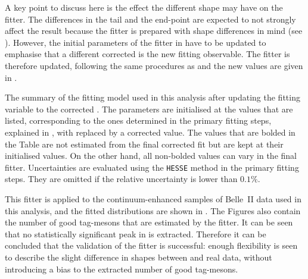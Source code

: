 A key point to discuss here is the effect the different \Mbc shape may have on the \Mbc fitter.
The differences in the tail and the end-point are expected to not strongly affect the result because the \Mbc fitter is prepared with shape differences in mind (see ).
However, the initial parameters of the \Mbc fitter in  have to be updated to emphasise that a different corrected \Mbc is the new fitting observable.
The \Mbc fitter is therefore updated, following the same procedures as  and the new values are given in .
\begin{table}[htbp!]
    \centering
    \caption{\label{tab:fitting_init_params_updated} The summary of the \Mbc fitting model used in this analysis after updating the fitting variable to the corrected \Mbc.
    The parameters are initialised at the values that are listed, corresponding to the ones determined in the primary fitting steps, explained in , with \Mbc replaced by a corrected \Mbc value.
    The values that are bolded in the Table are not estimated from the final corrected \Mbc fit but are kept at their initialised values.
    On the other hand, all non-bolded values can vary in the final fitter.
    Uncertainties are evaluated using the \texttt{HESSE} method in the primary fitting steps.
    They are omitted if the relative uncertainty is lower than $0.1\%$.
    }
    
\end{table}

This fitter is applied to the continuum-enhanced samples of Belle~II data used in this analysis,
and the  fitted \Mbc distributions are shown in .
The Figures also contain the number of good tag-\B mesons that are estimated by the fitter.
It can be seen that no statistically significant peak in \Mbc is extracted.
Therefore it can be concluded that the validation of the \Mbc fitter is successful: enough flexibility is seen
to describe the slight difference in \Mbc shapes between \MC and real data, without introducing a bias to the extracted number of good tag-\B mesons.



